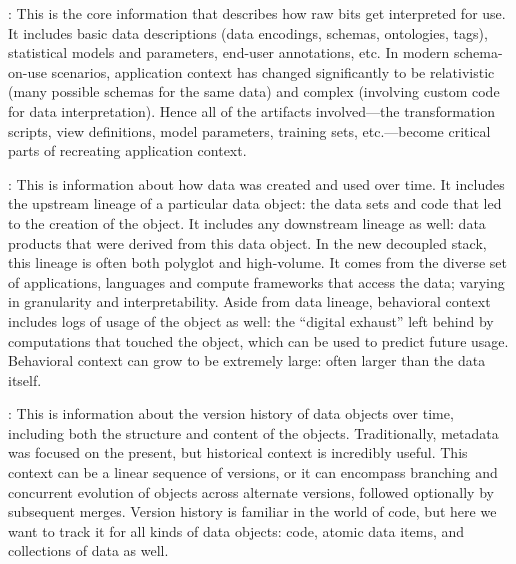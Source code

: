 \documentclass{sig-alternate}
\begin{document}

: This is the core information that describes how raw bits get interpreted for use. It includes basic data descriptions (data encodings, schemas, ontologies, tags), statistical models and parameters, end-user annotations, etc.  In modern schema-on-use scenarios, application context has changed significantly to be relativistic (many possible schemas for the same data) and complex (involving custom code for data interpretation).
Hence all of the artifacts involved---the transformation scripts, view definitions, model parameters, training sets, etc.---become critical parts of recreating application context. 

: This is information about how data was created and used over time. It includes the upstream lineage of a particular data object: the data sets and code that led to the creation of the object. It includes any downstream lineage as well: data products that were derived from this data object. In the new decoupled stack, this lineage is often both polyglot and high-volume. It comes from the diverse set of applications, languages and compute frameworks that access the data; varying in granularity and interpretability.
Aside from data lineage, behavioral context includes logs of usage of the object as well: the ``digital exhaust'' left behind by computations that touched the object, which can be used to predict future usage. Behavioral context can grow to be extremely large: often larger than the data itself. 

: This is information about the version history of data objects over time, including both the structure and content of the objects. Traditionally, metadata was focused on the present, but historical context is incredibly useful.
This context can be a linear sequence of versions, or it can encompass branching and concurrent evolution of objects across alternate versions, followed optionally by subsequent merges. Version history is familiar in the world of code, but here we want to track it for all kinds of data objects: code, atomic data items, and collections of data as well. 
\end{document}
